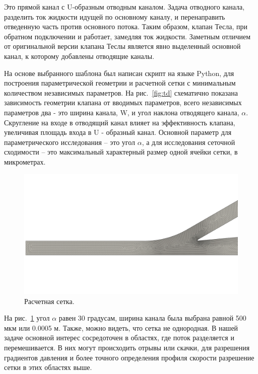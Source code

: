 \documentclass[14pt,a4paper]{article}
\begin{document}
        
        
        Это прямой канал с U-образным отводным каналом. Задача отводного канала, разделить ток жидкости идущей по основному каналу, и перенаправить отведенную часть против основного потока. Таким образом, клапан Тесла, при обратном подключении и работает, замедляя ток жидкости. Заметным отличием от оригинальной версии клапана Теслы является явно выделенный основной канал, к которому добавлены отводящие каналы.          
        
        На основе выбранного шаблона был написан скрипт на языке Python, для построения параметрической геометрии и расчетной сетки с минимальным количеством независимых параметров. На рис.~\ref{fig:td} схематично показана зависимость геометрии клапана от вводимых параметров, всего независимых параметров два - это ширина канала, W, и угол наклона отводящего канала, $ \alpha  $. Скругление на входе в отводящий канал влияет на эффективность клапана, увеличивая площадь входа в U - образный канал. Основной параметр для параметрического исследования -- это угол $ \alpha  $, а для исследования сеточной сходимости -- это максимальный характерный размер одной ячейки сетки, в микрометрах.
        
        \begin{figure}[h!]
            \centering
            \includegraphics[width = 1\linewidth]{teslaMesh1}
            \caption{Расчетная сетка.}
            \label{fig:teslaMesh}
        \end{figure}
        
        На рис.~\ref{fig:teslaMesh} угол $\alpha$ равен 30 градусам, ширина канала была выбрана равной 500 мкм или 0.0005 м. Также, можно видеть, что сетка не однородная. В нашей задаче основной интерес сосредоточен в областях, где поток разделяется и перемешивается. В них могут происходить отрывы или скачки, для разрешения градиентов давления и более точного определения профиля скорости разрешение сетки в этих областях выше.
        
\end{document}
